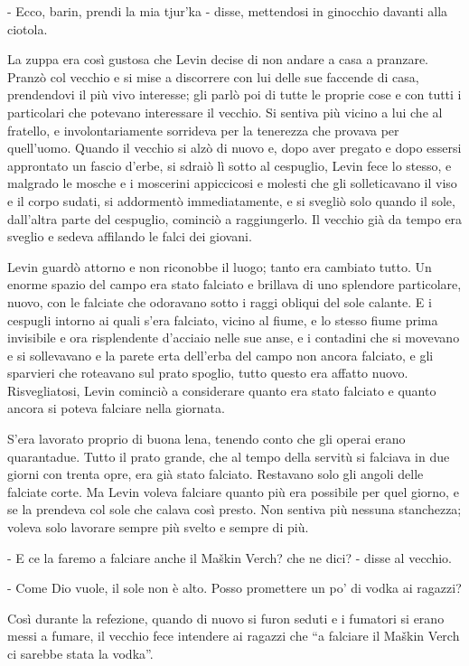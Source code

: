 - Ecco, barin, prendi la mia tjur'ka - disse, mettendosi in ginocchio davanti alla ciotola. 

La zuppa era così gustosa che Levin decise di non andare a casa a pranzare. Pranzò col vecchio e si mise a discorrere con lui delle sue faccende di casa, prendendovi il più vivo interesse; gli parlò poi di tutte le proprie cose e con tutti i particolari che potevano interessare il vecchio. Si sentiva più vicino a lui che al fratello, e involontariamente sorrideva per la tenerezza che provava per quell'uomo. Quando il vecchio si alzò di nuovo e, dopo aver pregato e dopo essersi approntato un fascio d'erbe, si sdraiò lì sotto al cespuglio, Levin fece lo stesso, e malgrado le mosche e i moscerini appiccicosi e molesti che gli solleticavano il viso e il corpo sudati, si addormentò immediatamente, e si svegliò solo quando il sole, dall'altra parte del cespuglio, cominciò a raggiungerlo. Il vecchio già da tempo era sveglio e sedeva affilando le falci dei giovani. 

Levin guardò attorno e non riconobbe il luogo; tanto era cambiato tutto. Un enorme spazio del campo era stato falciato e brillava di uno splendore particolare, nuovo, con le falciate che odoravano sotto i raggi obliqui del sole calante. E i cespugli intorno ai quali s'era falciato, vicino al fiume, e lo stesso fiume prima invisibile e ora risplendente d'acciaio nelle sue anse, e i contadini che si movevano e si sollevavano e la parete erta dell'erba del campo non ancora falciato, e gli sparvieri che roteavano sul prato spoglio, tutto questo era affatto nuovo. Risvegliatosi, Levin cominciò a considerare quanto era stato falciato e quanto ancora si poteva falciare nella giornata. 

S'era lavorato proprio di buona lena, tenendo conto che gli operai erano quarantadue. Tutto il prato grande, che al tempo della servitù si falciava in due giorni con trenta opre, era già stato falciato. Restavano solo gli angoli delle falciate corte. Ma Levin voleva falciare quanto più era possibile per quel giorno, e se la prendeva col sole che calava così presto. Non sentiva più nessuna stanchezza; voleva solo lavorare sempre più svelto e sempre di più. 

- E ce la faremo a falciare anche il Maškin Verch? che ne dici? - disse al vecchio. 

- Come Dio vuole, il sole non è alto. Posso promettere un po' di vodka ai ragazzi? 

Così durante la refezione, quando di nuovo si furon seduti e i fumatori si erano messi a fumare, il vecchio fece intendere ai ragazzi che ``a falciare il Maškin Verch ci sarebbe stata la vodka''. 

